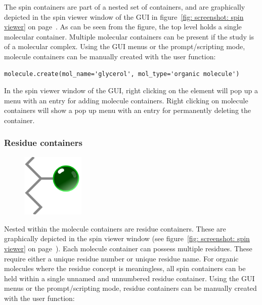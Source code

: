 The spin containers are part of a nested set of containers, and are graphically depicted in the spin viewer window of the GUI in figure~\ref{fig: screenshot: spin viewer} on page~\pageref{fig: screenshot: spin viewer}.  As can be seen from the figure, the top level holds a single molecular container.  Multiple molecular containers can be present if the study is of a molecular complex.  Using the GUI menus or the prompt/scripting mode, molecule containers can be manually created with the user function:

\begin{lstlisting}
molecule.create(mol_name='glycerol', mol_type='organic molecule')
\end{lstlisting}

In the spin viewer window of the GUI, right clicking on the  element will pop up a menu with an entry for adding molecule containers.  Right clicking on molecule containers will show a pop up menu with an entry for permanently deleting the container.



\subsubsection{Residue containers}

\begin{figure}[h]
\includegraphics[width=3cm, bb=0 0 1701 1701]{graphics/misc/residue_600x600}
\end{figure}

Nested within the molecule containers are residue containers.  These are graphically depicted in the spin viewer window (see figure~\ref{fig: screenshot: spin viewer} on page~\pageref{fig: screenshot: spin viewer}).  Each molecule container can possess multiple residues.  These require either a unique residue number or unique residue name.  For organic molecules where the residue concept is meaningless, all spin containers can be held within a single unnamed and unnumbered residue container.  Using the GUI menus or the prompt/scripting mode, residue containers can be manually created with the user function:

